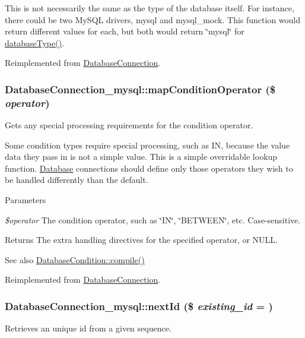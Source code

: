 This is not necessarily the same as the type of the database itself. For instance, there could be two MySQL drivers, mysql and mysql\_\-mock. This function would return different values for each, but both would return \char`\"{}mysql\char`\"{} for \hyperlink{classDatabaseConnection__mysql_a983f8932fcaa5f3806c78e28841e7a5b}{databaseType()}. 

Reimplemented from \hyperlink{classDatabaseConnection_a4a36a8d7352108c837c51a7172f966c3}{DatabaseConnection}.\hypertarget{classDatabaseConnection__mysql_a8d36611a923f44b9dd5d1ed05ba84eb3}{
\subsubsection[{mapConditionOperator}]{\setlength{\rightskip}{0pt plus 5cm}DatabaseConnection\_\-mysql::mapConditionOperator (\$ {\em operator})}}
\label{classDatabaseConnection__mysql_a8d36611a923f44b9dd5d1ed05ba84eb3}
Gets any special processing requirements for the condition operator.

Some condition types require special processing, such as IN, because the value data they pass in is not a simple value. This is a simple overridable lookup function. \hyperlink{classDatabase}{Database} connections should define only those operators they wish to be handled differently than the default.


\begin{DoxyParams}{Parameters}
\item[{\em \$operator}]The condition operator, such as \char`\"{}IN\char`\"{}, \char`\"{}BETWEEN\char`\"{}, etc. Case-\/sensitive.\end{DoxyParams}
\begin{DoxyReturn}{Returns}
The extra handling directives for the specified operator, or NULL.
\end{DoxyReturn}
\begin{DoxySeeAlso}{See also}
\hyperlink{classDatabaseCondition_a286df1af0dfaa7ab6b8b30ed4e96a830}{DatabaseCondition::compile()} 
\end{DoxySeeAlso}


Reimplemented from \hyperlink{classDatabaseConnection_aef82436b30fa08a6c81c34e11f3b1717}{DatabaseConnection}.\hypertarget{classDatabaseConnection__mysql_a89a5362c5a53f7e2a60e75076a4cba11}{
\subsubsection[{nextId}]{\setlength{\rightskip}{0pt plus 5cm}DatabaseConnection\_\-mysql::nextId (\$ {\em existing\_\-id} = {})}}
\label{classDatabaseConnection__mysql_a89a5362c5a53f7e2a60e75076a4cba11}
Retrieves an unique id from a given sequence.


